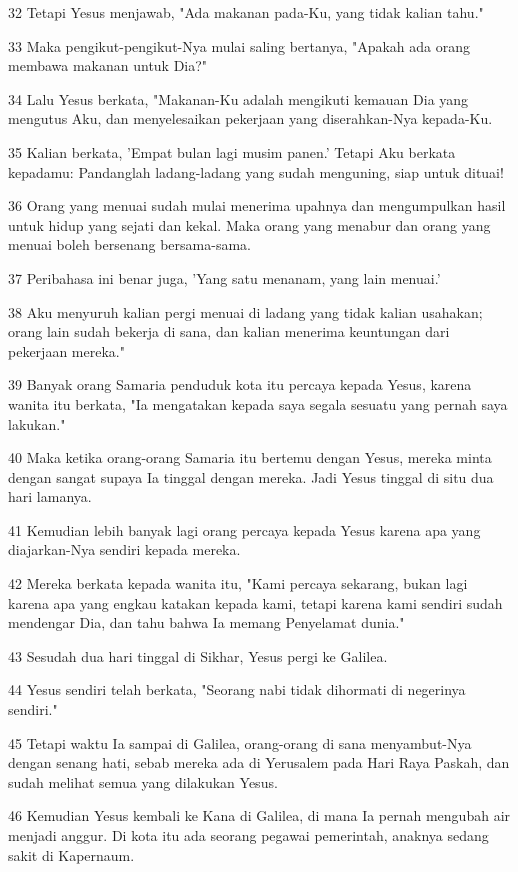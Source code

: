 \par 32 Tetapi Yesus menjawab, "Ada makanan pada-Ku, yang tidak kalian tahu."
\par 33 Maka pengikut-pengikut-Nya mulai saling bertanya, "Apakah ada orang membawa makanan untuk Dia?"
\par 34 Lalu Yesus berkata, "Makanan-Ku adalah mengikuti kemauan Dia yang mengutus Aku, dan menyelesaikan pekerjaan yang diserahkan-Nya kepada-Ku.
\par 35 Kalian berkata, 'Empat bulan lagi musim panen.' Tetapi Aku berkata kepadamu: Pandanglah ladang-ladang yang sudah menguning, siap untuk dituai!
\par 36 Orang yang menuai sudah mulai menerima upahnya dan mengumpulkan hasil untuk hidup yang sejati dan kekal. Maka orang yang menabur dan orang yang menuai boleh bersenang bersama-sama.
\par 37 Peribahasa ini benar juga, 'Yang satu menanam, yang lain menuai.'
\par 38 Aku menyuruh kalian pergi menuai di ladang yang tidak kalian usahakan; orang lain sudah bekerja di sana, dan kalian menerima keuntungan dari pekerjaan mereka."
\par 39 Banyak orang Samaria penduduk kota itu percaya kepada Yesus, karena wanita itu berkata, "Ia mengatakan kepada saya segala sesuatu yang pernah saya lakukan."
\par 40 Maka ketika orang-orang Samaria itu bertemu dengan Yesus, mereka minta dengan sangat supaya Ia tinggal dengan mereka. Jadi Yesus tinggal di situ dua hari lamanya.
\par 41 Kemudian lebih banyak lagi orang percaya kepada Yesus karena apa yang diajarkan-Nya sendiri kepada mereka.
\par 42 Mereka berkata kepada wanita itu, "Kami percaya sekarang, bukan lagi karena apa yang engkau katakan kepada kami, tetapi karena kami sendiri sudah mendengar Dia, dan tahu bahwa Ia memang Penyelamat dunia."
\par 43 Sesudah dua hari tinggal di Sikhar, Yesus pergi ke Galilea.
\par 44 Yesus sendiri telah berkata, "Seorang nabi tidak dihormati di negerinya sendiri."
\par 45 Tetapi waktu Ia sampai di Galilea, orang-orang di sana menyambut-Nya dengan senang hati, sebab mereka ada di Yerusalem pada Hari Raya Paskah, dan sudah melihat semua yang dilakukan Yesus.
\par 46 Kemudian Yesus kembali ke Kana di Galilea, di mana Ia pernah mengubah air menjadi anggur. Di kota itu ada seorang pegawai pemerintah, anaknya sedang sakit di Kapernaum.
